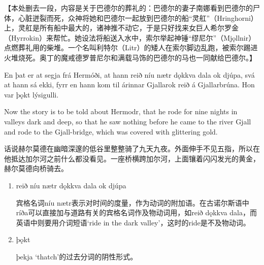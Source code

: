 【本处删去一段，内容是关于巴德尔的葬礼的：巴德尔的妻子南娜看到巴德尔的尸体，心脏迸裂而死，众神将她和巴德尔一起放到巴德尔的船“灵舡”（Hringhorni）上，灵舡是所有船中最大的，诸神推不动它，于是只好找来女巨人希尔罗金（Hyrrokin）来帮忙。她设法将船送入水中，索尔举起神锤“缪尼尔”（Mjǫllnir）点燃葬礼用的柴堆。一个名叫利特尔（Litr）的矮人在索尔脚边乱跑，被索尔踢进火堆烧死。奥丁的魔戒德罗普尼尔和满载马饰的巴德尔的马也一同献给巴德尔。】
\hspace*{\fill}\\
\begin{paracol}{2}
    En þat er at segja frá Hermóði, at hann reið níu nætr dǫkkva dala ok djúpa, svá at hann sá ekki, fyrr en hann kom til árinnar Gjallar\footnotemark[1] ok reið á Gjallarbrúna. Hon var þǫkt lýsigulli.

    \switchcolumn

    Now the story is to be told about Hermodr, that he rode for nine nights in valleys dark and deep, so that he saw nothing before he came to the river Gjall and rode to the Gjall-bridge, which was covered with glittering gold.
\end{paracol}
\begin{translation*}{}
    话说赫尔莫德在幽暗深邃的低谷里整整骑了九天九夜。外面伸手不见五指，所以在他抵达加尔河之前什么都没看见。一座桥横跨加尔河，上面镶着闪闪发光的黄金，赫尔莫德向桥骑去。
\end{translation*}
\begin{grammar*}{}
    \begin{enumerate}[leftmargin=*]
        \item reið níu nætr dǫkkva dala ok djúpa

              宾格名词níu nætr表示对时间的度量，作为动词的附加语。在古诺尔斯语中ríða可以直接加与道路有关的宾格名词作及物动词用，如reið dǫkkva dala，而英语中则要用介词短语`ride in the dark valley'，这时的ride是不及物动词。

        \item þǫkt

              þekja `thatch'的过去分词的阴性形式。
    \end{enumerate}
\end{grammar*}
